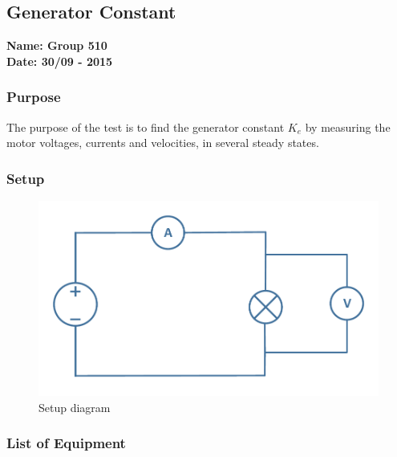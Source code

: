 \pagebreak
\subsection{Generator Constant}%
\textbf{Name: Group 510}\\
\textbf{Date: 30/09 - 2015}

\subsubsection{Purpose}
The purpose of the test is to find the generator constant $K_e$ by measuring the motor voltages, currents and velocities, in several steady states.

\subsubsection{Setup}
\begin{figure}[H]
  \centering
	\includegraphics[scale=0.5]{figures/MotorTest4.pdf}
	\caption{Setup diagram}
\end{figure}

\subsubsection{List of Equipment}

